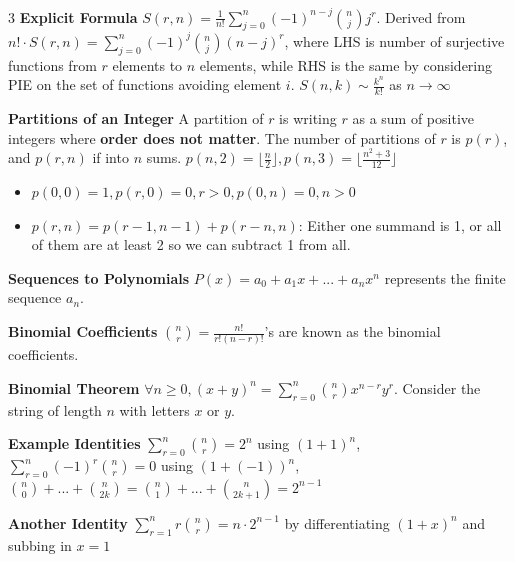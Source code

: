 \documentclass[10pt, landscape]{article}
\begin{document}
\begin{multicols*}{3}
\textbf{Explicit Formula} $S(r,n)=\frac{1}{n!}\sum_{j=0}^n(-1)^{n-j}{n \choose j}j^r$. Derived from $n!\cdot S(r,n)=\sum_{j=0}^n(-1)^j{n \choose j}(n-j)^r$, where LHS is number of surjective functions from $r$ elements to $n$ elements, while RHS is the same by considering PIE on the set of functions avoiding element $i$. $S(n,k)\sim \frac{k^n}{k!}$ as $n \rightarrow \infty$

\textbf{Partitions of an Integer} A partition of $r$ is writing $r$ as a sum of positive integers where \textbf{order does not matter}. The number of partitions of $r$ is $p(r)$, and  $p(r,n)$ if into $n$ sums. $p(n, 2) = \lfloor \frac{n}{2} \rfloor, p(n, 3)=\lfloor \frac{n^2+3}{12}\rfloor$
\begin{itemize}
    \item $p(0,0)=1, p(r,0)=0, r>0, p(0,n)=0,n>0$
    \item $p(r, n)=p(r-1, n-1)+p(r-n, n)$: Either one summand is 1, or all of them are at least 2 so we can subtract 1 from all.
\end{itemize}




\textbf{Sequences to Polynomials} $P(x)=a_0+a_1x+...+a_nx^n$ represents the finite sequence $a_n$.

\textbf{Binomial Coefficients} ${n \choose r}=\frac{n!}{r!(n-r)!}$'s are known as the binomial coefficients.

\textbf{Binomial Theorem} $\forall n\geq 0,(x+y)^n=\sum_{r=0}^n{n \choose r}x^{n-r}y^r$. Consider the string of length $n$ with letters $x$ or $y$.

\textbf{Example Identities} $\sum_{r=0}^n {n \choose r}=2^n$ using $(1+1)^n$, $\sum_{r=0}^n(-1)^r{n \choose r}=0$ using $(1+(-1))^n$, ${n \choose 0}+...+{n \choose 2k}={n \choose 1}+...+{n \choose 2k+1}=2^{n-1}$

\textbf{Another Identity} $\sum_{r=1}^n r {n \choose r}=n \cdot 2^{n-1}$ by differentiating $(1+x)^n$ and subbing in $x=1$


\end{multicols*}
\end{document}
